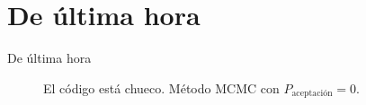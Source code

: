 \documentclass[xcolor=dvipsnames,presentation]{beamer}%
\begin{document}
{
\AtBeginSection{}
\section{De última hora}
\begin{frame}{De última hora}
\begin{figure}
\centering
\caption{El código está chueco. Método 
MCMC con $P_{\text{aceptación}}=0$.}
\end{figure}
\end{frame}
}
\end{document}
